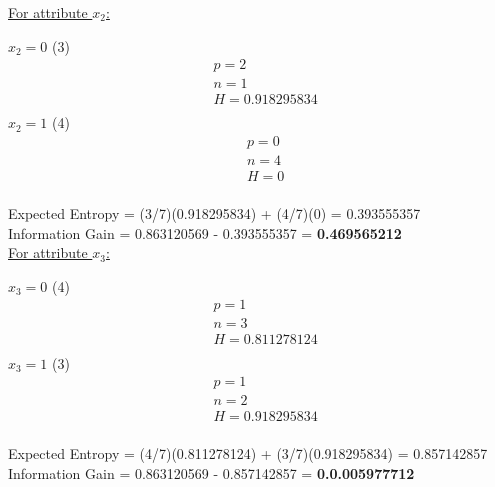 \documentclass[8pt, fullpage,letterpaper]{article}
\begin{document}
\begin{enumerate}
\begin{enumerate}
\begin{enumerate}
\begin{enumerate}
\begin{itemize}
						\underline {For attribute $x_2$:} 
							\vspace{-5pt}
							\begin{multicols}{2}
								$x_2=0$ (3)
			 						\begin{align*}
									    	& p = 2\\
										& n = 1 \\
									    	& H = 0.918295834\\
								      \end{align*}
								$x_2=1$ (4)
			 						\begin{align*}
									    	& p = 0\\
										& n = 4 \\
									    	& H = 0\\
								      \end{align*}
							\end{multicols}
							\vspace{-20pt}
							Expected Entropy = (3/7)(0.918295834) + (4/7)(0) = 0.393555357\\
							Information Gain = 0.863120569 - 0.393555357 = {\bf 0.469565212}\\

						\underline {For attribute $x_3$:} 
							\vspace{-5pt}
							\begin{multicols}{2}
								$x_3=0$ (4)
			 						\begin{align*}
									    	& p = 1\\
										& n = 3 \\
									    	& H = 0.811278124\\
								      \end{align*}
								$x_3=1$ (3)
			 						\begin{align*}
									    	& p = 1\\
										& n = 2 \\
									    	& H = 0.918295834\\
								      \end{align*}
							\end{multicols}
							\vspace{-20pt}
							Expected Entropy = (4/7)(0.811278124) + (3/7)(0.918295834) = 0.857142857\\
							Information Gain = 0.863120569 - 0.857142857 = {\bf 0.0.005977712}\\


\end{itemize}
\end{enumerate}
\end{enumerate}
\end{enumerate}
\end{enumerate}
\end{document}
